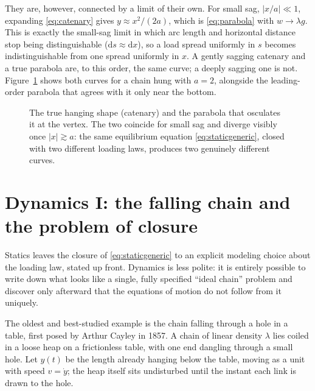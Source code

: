 \documentclass[11pt]{book}
\newcommand{\dd}{\mathrm{d}}
\begin{document}
They are, however, connected by a limit of their own. For small sag, $|x/a|\ll 1$, expanding \eqref{eq:catenary} gives $y \approx x^2/(2a)$, which is \eqref{eq:parabola} with $w\to \lambda g$. This is exactly the small-sag limit in which arc length and horizontal distance stop being distinguishable ($\dd s\approx \dd x$), so a load spread uniformly in $s$ becomes indistinguishable from one spread uniformly in $x$. A gently sagging catenary and a true parabola are, to this order, the same curve; a deeply sagging one is not. Figure~\ref{fig:catenary} shows both curves for a chain hung with $a=2$, alongside the leading-order parabola that agrees with it only near the bottom.

\begin{figure}[h]
\centering
{}
\caption{The true hanging shape (catenary) and the parabola that osculates it at the vertex. The two coincide for small sag and diverge visibly once $|x|\gtrsim a$: the same equilibrium equation \eqref{eq:staticgeneric}, closed with two different loading laws, produces two genuinely different curves.}
\label{fig:catenary}
\end{figure}

\section{Dynamics I: the falling chain and the problem of closure}
\label{sec:falling}

Statics leaves the closure of \eqref{eq:staticgeneric} to an explicit modeling choice about the loading law, stated up front. Dynamics is less polite: it is entirely possible to write down what looks like a single, fully specified ``ideal chain'' problem and discover only afterward that the equations of motion do not follow from it uniquely.

The oldest and best-studied example is the chain falling through a hole in a table, first posed by Arthur Cayley in 1857. A chain of linear density $\lambda$ lies coiled in a loose heap on a frictionless table, with one end dangling through a small hole. Let $y(t)$ be the length already hanging below the table, moving as a unit with speed $v=\dot y$; the heap itself sits undisturbed until the instant each link is drawn to the hole.
\end{document}
